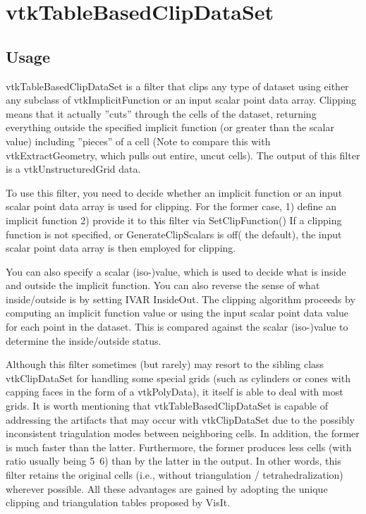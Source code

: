 \section{vtkTableBasedClipDataSet}

\subsection{Usage}

  vtkTableBasedClipDataSet is a filter that clips any type of dataset using 
  either any subclass of vtkImplicitFunction or an input scalar point data 
  array. Clipping means that it actually ''cuts'' through the cells of the 
  dataset, returning everything outside the specified implicit function (or 
  greater than the scalar value) including ''pieces'' of a cell (Note to compare 
  this with vtkExtractGeometry, which pulls out entire, uncut cells). The 
  output of this filter is a vtkUnstructuredGrid data.

  To use this filter, you need to decide whether an implicit function or an 
  input scalar point data array is used for clipping. For the former case, 
  1) define an implicit function
  2) provide it to this filter via SetClipFunction()
  If a clipping function is not specified, or GenerateClipScalars is off( the 
  default), the input scalar point data array is then employed for clipping.

  You can also specify a scalar (iso-)value, which is used to decide what is
  inside and outside the implicit function. You can also reverse the sense of 
  what inside/outside is by setting IVAR InsideOut. The clipping algorithm 
  proceeds by computing an implicit function value or using the input scalar 
  point data value for each point in the dataset. This is compared against the 
  scalar (iso-)value to determine the inside/outside status.

  Although this filter sometimes (but rarely) may resort to the sibling class
  vtkClipDataSet for handling some special grids (such as cylinders or cones 
  with capping faces in the form of a vtkPolyData), it itself is able to deal
  with most grids. It is worth mentioning that vtkTableBasedClipDataSet is 
  capable of addressing the artifacts that may occur with vtkClipDataSet due 
  to the possibly inconsistent triagulation modes between neighboring cells. 
  In addition, the former is much faster than the latter. Furthermore, the 
  former produces less cells (with ratio usually being 5~6) than by the latter 
  in the output. In other words, this filter retains the original cells (i.e., 
  without triangulation / tetrahedralization) wherever possible. All these 
  advantages are gained by adopting the unique clipping and triangulation tables
  proposed by VisIt.



